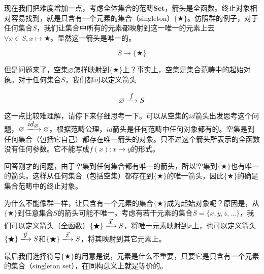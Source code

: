 \documentclass{article}
\begin{document}
\begin{example}
现在我们把难度增加一点，考虑全体集合的范畴$\pmb{Set}$，箭头是全函数。终止对象相对容易找到，就是只含有一个元素的集合（singleton）$\{ \bigstar \}$。仿照群的例子，对于任何集合$S$，我们让集合中所有的元素都映射到这一唯一的元素上去$\forall x \in S, x \mapsto \bigstar$。显然这一箭头是唯一的。

\[
  S \longrightarrow \{ \bigstar \}
\]

但是问题来了，空集$\varnothing$怎样映射到$\{ \bigstar \}$上？事实上，空集是集合范畴中的起始对象。对于任何集合$S$，我们都可以定义箭头

\[
  \varnothing \arrowto{f} S
\]

这一点比较难理解，请停下来仔细思考一下。可以从空集的$id$箭头出发思考这个问题，$\varnothing \arrowto{id_{\varnothing}} \varnothing$。根据范畴公理，$id$箭头是任何范畴中任何对象都有的。空集是到任何集合（包括它自己）都存在唯一箭头的对象。只不过这个箭头所表示的全函数没有任何参数。它不能写成$f(x): x \mapsto y$的形式。

回答刚才的问题，由于空集到任何集合都有唯一的箭头，所以空集到$\{ \bigstar \}$也有唯一的箭头。这样从任何集合（包括空集）都存在到$\{ \bigstar \}$的唯一箭头，因此$\{ \bigstar \}$的确是集合范畴中的终止对象。

为什么不能像群一样，让只含有一个元素的集合$\{ \bigstar \}$成为起始对象呢？原因是，从$\{ \bigstar \}$到任意集合$S$的箭头可能不唯一。考虑有若干元素的集合$S = \{x, y, z, ...\}$，我们可以定义箭头（全函数）$\{ \bigstar \} \arrowto{\vec{x}} S$，将唯一元素映射到$x$上，也可以定义箭头$\{ \bigstar \} \arrowto{\vec{y}} S$和$\{ \bigstar \} \arrowto{\vec{z}} S$，将其映射到其它元素上。

最后我们选择符号$\{ \bigstar \}$的用意是说，元素是什么不重要，只要它是只含有一个元素的集合（singleton set），在同构意义上就是等价的。
\end{example}
\end{document}
